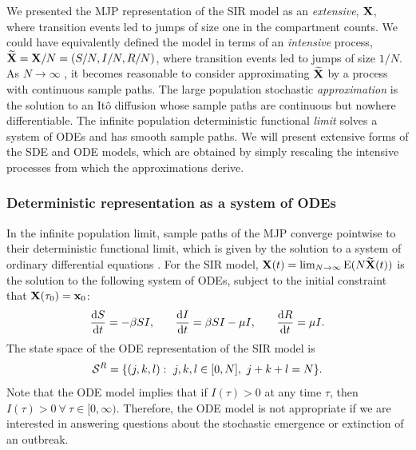 We presented the MJP representation of the SIR model as an \textit{extensive}, $ \mathbf{X} $, where transition events led to jumps of size one in the compartment counts. We could have equivalently defined the model in terms of an \textit{intensive} process, $ \widetilde{\mathbf{X}} = \mathbf{X} / N = (S/N,I/N,R/N) $, where transition events led to jumps of size $ 1/N $. As $ N\longrightarrow \infty$ , it becomes reasonable to consider approximating $ \widetilde{\mathbf{X}} $ by a process with continuous sample paths. The large population stochastic \textit{approximation} is the solution to an It\^{o} diffusion whose sample paths are continuous but nowhere differentiable. The infinite population deterministic functional \textit{limit} solves a system of ODEs and has smooth sample paths. We will present extensive forms of the SDE and ODE models, which are obtained by simply rescaling the intensive processes from which the approximations derive. 

\subsubsection{Deterministic representation as a system of ODEs}
\label{subsec:deterministic_models}

In the infinite population limit, sample paths of the MJP converge pointwise to their deterministic functional limit, which is given by the solution to a system of ordinary differential equations \cite{greenwood2009stochastic,kurtz1981approximation}. For the SIR model, $ \mathbf{X}(t)  = \lim_{N \rightarrow \infty} \mathrm{E}(N\widetilde{\mathbf{X}}(t))$ is the solution to the following system of ODEs, subject to the initial constraint that $ \mathbf{X}(\tau_0) = \mathbf{x}_0 $:
\begin{align*}
\frac{\mathrm{d} S}{\mathrm{d} t} = -\beta S I,\hspace{0.25in} 
\frac{\mathrm{d} I}{\mathrm{d} t} = \beta S I - \mu I,\hspace{0.25in} 
\frac{\mathrm{d} R}{\mathrm{d} t} = \mu I.
\end{align*}
The state space of the ODE representation of the SIR model is $$ \mcS^R =  \lbrace(j,k,l):\ j,k,l\in[0,N],\  j+k+l = N\rbrace. $$ Note that the ODE model implies that if $ I(\tau) > 0 $ at any time $ \tau $, then $ I(\tau) > 0\ \forall\ \tau\in[0,\infty)$. Therefore, the ODE model is not appropriate if we are interested in answering questions about the stochastic emergence or extinction of an outbreak.

